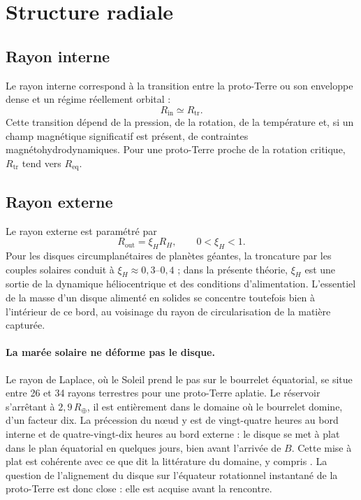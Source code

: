 \documentclass[11pt,a4paper,openany]{report}
\newcommand{\Rt}{R_{\oplus}}
\newcommand{\Req}{R_{\mathrm{eq}}}
\begin{document}
\section{Structure radiale}
\subsection{Rayon interne}

Le rayon interne correspond à la transition entre la proto-Terre ou son enveloppe dense et un
régime réellement orbital :
\begin{equation}
R_{\mathrm{in}}\simeq R_{\mathrm{tr}}.
\label{eq:Rin}
\end{equation}
Cette transition dépend de la pression, de la rotation, de la température et, si un champ
magnétique significatif est présent, de contraintes magnétohydrodynamiques. Pour une
proto-Terre proche de la rotation critique, $R_{\mathrm{tr}}$ tend vers $\Req$.

\subsection{Rayon externe}

Le rayon externe est paramétré par
\begin{equation}
R_{\mathrm{out}}=\xi_H R_H,\qquad 0<\xi_H<1.
\label{eq:Rout}
\end{equation}
Pour les disques circumplanétaires de planètes géantes, la troncature par les couples solaires
conduit à $\xi_H\approx0{,}3$--$0{,}4$ \cite{QuillenTrilling1998,MartinLubow2011} ; dans la présente
théorie, $\xi_H$ est une sortie de la dynamique héliocentrique et des conditions d'alimentation.
L'essentiel de la masse d'un disque alimenté en solides se concentre toutefois bien à l'intérieur
de ce bord, au voisinage du rayon de circularisation de la matière capturée.

\paragraph{La marée solaire ne déforme pas le disque.}
Le rayon de Laplace, où le Soleil prend le pas sur le bourrelet équatorial, se situe entre 26 et
34 rayons terrestres pour une proto-Terre aplatie. Le réservoir s'arrêtant à $2{,}9\,\Rt$, il est
entièrement dans le domaine où le bourrelet domine, d'un facteur dix. La précession du nœud y est
de vingt-quatre heures au bord interne et de quatre-vingt-dix heures au bord externe : le disque se
met à plat dans le plan équatorial en quelques jours, bien avant l'arrivée de $B$. Cette mise à
plat est cohérente avec ce que dit la littérature du domaine, y compris
\cite{PahlevanMorbidelli2015}. La question de l'alignement du disque sur l'équateur rotationnel
instantané de la proto-Terre est donc close : elle est acquise avant la rencontre.
\end{document}
